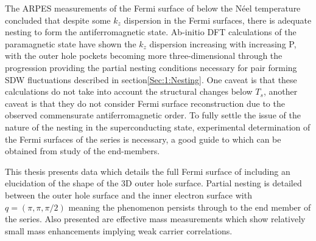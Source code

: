 The \ac{ARPES} measurements of the Fermi surface of \BaFeAs below the N\'eel temperature concluded that despite some $k_z$ dispersion in the Fermi surfaces, there is adequate nesting to form the antiferromagnetic state. Ab-initio DFT calculations\cite{Shishido2010} of the paramagnetic state have shown the $k_z$ dispersion increasing with increasing P, with the outer hole pockets becoming more three-dimensional through the progression providing the partial nesting conditions necessary for pair forming \ac{SDW} fluctuations described in section\ref{Sec:1:Nesting}. One caveat is that these calculations do not take into account the structural changes below $T_s$, another caveat is that they do not consider Fermi surface reconstruction due to the observed commensurate antiferromagnetic order. To fully settle the issue of the nature of the nesting in the superconducting state, experimental determination of the Fermi surfaces of the series is necessary, a good guide to which can be obtained from study of the end-members.


This thesis presents data which details the full Fermi surface of \BaFeP including an elucidation of the shape of the 3D outer hole surface. Partial nesting is detailed between the outer hole surface and the inner electron surface with $q=(\pi, \pi, \pi/2)$ meaning the phenomenon persists through to the end member of the series. Also presented are effective mass measurements which show relatively small mass enhancements implying weak carrier correlations.


